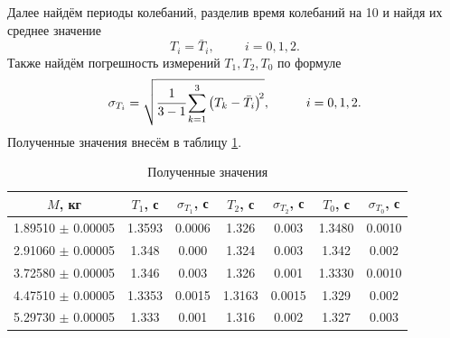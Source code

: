 \documentclass[a4paper,12pt]{article}
\theoremstyle{plain} %
\theoremstyle{definition} %
\theoremstyle{remark} %
\begin{document}
Далее найдём периоды колебаний, разделив время колебаний на 10 и найдя их среднее значение
$$T_i=\bar{T}_i, \hspace{1cm} i=0, 1, 2.$$
Также найдём погрешность измерений $T_1, T_2, T_0$ по формуле
\begin{equation}
\sigma_{T_i}=\sqrt{\cfrac{1}{3-1}\sum_{k=1}^3 \left(T_k-\bar{T}_i\right)^{\!2}}, \hspace{1cm} i=0, 1, 2.
\label{34}
\end{equation}
Полученные значения внесём в таблицу \ref{my-label1}.
\begin{table}[h!]
	\centering
	\caption{Полученные значения}
	\label{my-label1}
	\begin{tabular}{|c|c|c|c|c|c|c|}
		\hline
		$M$, кг               & $T_1$, с & $\sigma_{T_1}$, с & $T_2$, с & $\sigma_{T_2}$, с & $T_0$, с & $\sigma_{T_0}$, с \\ \hline
		1.89510 $\pm$ 0.00005 & 1.3593   & 0.0006            & 1.326    & 0.003             & 1.3480   & 0.0010             \\ \hline
		2.91060 $\pm$ 0.00005  & 1.348    & 0.000                 & 1.324    & 0.003             & 1.342    & 0.002              \\ \hline
		3.72580 $\pm$ 0.00005  & 1.346    & 0.003             & 1.326    & 0.001             & 1.3330   & 0.0010             \\ \hline
		4.47510 $\pm$ 0.00005 & 1.3353   & 0.0015            & 1.3163   & 0.0015            & 1.329    & 0.002              \\ \hline
		5.29730 $\pm$ 0.00005 & 1.333    & 0.001             & 1.316    & 0.002             & 1.327    & 0.003              \\ \hline
	\end{tabular}
\end{table}
\end{document}
